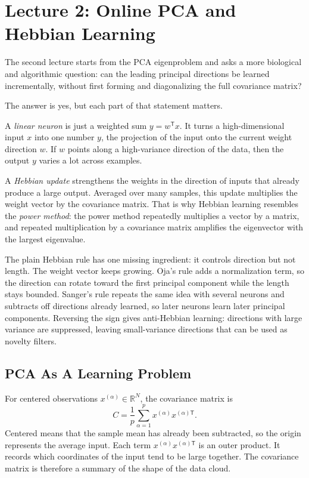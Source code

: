 \section{Lecture 2: Online PCA and Hebbian Learning}

The second lecture starts from the PCA eigenproblem and asks a more biological and algorithmic question: can the leading principal directions be learned incrementally, without first forming and diagonalizing the full covariance matrix?

The answer is yes, but each part of that statement matters.

A \emph{linear neuron} is just a weighted sum \(y=w^{\mathsf{T}}x\). It turns a high-dimensional input \(x\) into one number \(y\), the projection of the input onto the current weight direction \(w\). If \(w\) points along a high-variance direction of the data, then the output \(y\) varies a lot across examples.

A \emph{Hebbian update} strengthens the weights in the direction of inputs that already produce a large output. Averaged over many samples, this update multiplies the weight vector by the covariance matrix. That is why Hebbian learning resembles the \emph{power method}: the power method repeatedly multiplies a vector by a matrix, and repeated multiplication by a covariance matrix amplifies the eigenvector with the largest eigenvalue.

The plain Hebbian rule has one missing ingredient: it controls direction but not length. The weight vector keeps growing. Oja's rule adds a normalization term, so the direction can rotate toward the first principal component while the length stays bounded. Sanger's rule repeats the same idea with several neurons and subtracts off directions already learned, so later neurons learn later principal components. Reversing the sign gives anti-Hebbian learning: directions with large variance are suppressed, leaving small-variance directions that can be used as novelty filters.

\subsection{PCA As A Learning Problem}

For centered observations \(x^{(\alpha)}\in\mathbb{R}^N\), the covariance matrix is
\[
  C
  =
  \frac{1}{p}
  \sum_{\alpha=1}^{p}
  x^{(\alpha)}x^{(\alpha)\mathsf{T}}.
\]
Centered means that the sample mean has already been subtracted, so the origin represents the average input. Each term \(x^{(\alpha)}x^{(\alpha)\mathsf{T}}\) is an outer product. It records which coordinates of the input tend to be large together. The covariance matrix is therefore a summary of the shape of the data cloud.

